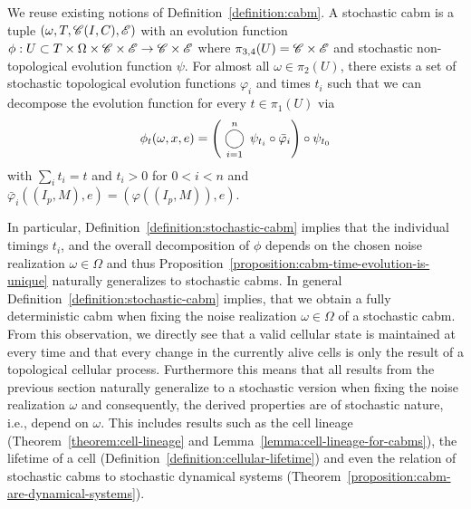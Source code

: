 \begin{definition}
    We reuse existing notions of Definition~\ref{definition:cabm}.
    A stochastic \acl{cabm} is a tuple $(\omega,T,\mathscr{C}(I,C),\mathscr{E})$ with an evolution function
    $\phi:U\subset T\times\Omega\times\mathscr{C}\times\mathscr{E}\rightarrow\mathscr{C}\times\mathscr{E}$ where
    $\pi_{3,4}(U)=\mathscr{C}\times\mathscr{E}$ and stochastic non-topological evolution function $\psi$.
    For almost all $\omega\in\pi_2(U)$, there exists a set of stochastic topological evolution
    functions $\varphi_i$ and times $t_i$ such that we can decompose the evolution function for
    every $t\in\pi_1(U)$ via
    \begin{equation}
        \phi_t(\omega,x,e)=
            \left(\bigcomp_{i=1}^n\psi_{t_i}\circ\bar{\varphi}_i\right)\circ\psi_{t_0}
    \end{equation}
    with $\sum_i t_i=t$ and $t_i>0$ for $0<i<n$ and
    $\bar{\varphi}_i((I_p,M),e)=(\varphi((I_p,M)),e)$.
    \label{definition:stochastic-cabm}
\end{definition}

In particular, Definition~\ref{definition:stochastic-cabm} implies that the individual timings
$t_i$, and the overall decomposition of $\phi$ depends on the chosen noise realization
$\omega\in\Omega$ and
thus Proposition~\ref{proposition:cabm-time-evolution-is-unique} naturally generalizes to stochastic
\acp{cabm}.
In general Definition~\ref{definition:stochastic-cabm} implies, that we obtain a fully deterministic
\ac{cabm} when fixing the noise realization $\omega\in\Omega$ of a stochastic \ac{cabm}.
From this observation, we directly see that a valid cellular state is maintained at every time and
that every change in the currently alive cells is only the result of a topological cellular process.
Furthermore this means that all results from the previous section naturally generalize to a
stochastic version when fixing the noise realization $\omega$ and consequently, the derived
properties are of stochastic nature, i.e., depend on $\omega$.
This includes results such as the cell lineage (Theorem~\ref{theorem:cell-lineage} and
Lemma~\ref{lemma:cell-lineage-for-cabms}), the lifetime of a cell
(Definition~\ref{definition:cellular-lifetime}) and even the relation of stochastic \acp{cabm} to
stochastic dynamical systems (Theorem~\ref{proposition:cabm-are-dynamical-systems}).

